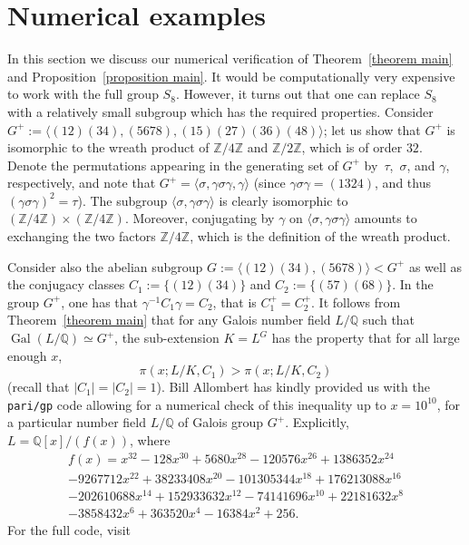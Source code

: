 \documentclass[10pt]{amsart}
\theoremstyle{definition}
\DeclareMathOperator{\Gal}{Gal}
\newcommand{\Q}{\mathbb Q}
\newcommand{\Z}{\mathbb Z}
\begin{document}
\section{Numerical examples}\label{sec:numerics}

In this section we discuss our numerical verification of Theorem~\ref{theorem main} and Proposition~\ref{proposition main}. It would be computationally very expensive to work with the full group $S_8$. However, it turns out that one can replace $S_8$ with a relatively small subgroup which has the required properties.
Consider $G^+:=\langle (12)(34),(5678),(15)(27)(36)(48) \rangle $; let us show that $G^+$ is isomorphic to the wreath product of $\Z/4\Z$ and $\Z/2\Z$, which is of order $32$.
Denote the permutations appearing in the generating set of $G^+$ by~$\tau$,~$\sigma$, and $\gamma$, respectively, and note that
$G^+=\langle \sigma,\gamma\sigma\gamma,\gamma\rangle$
(since $\gamma\sigma\gamma=(1324)$, and thus $(\gamma\sigma\gamma)^2=\tau$).
The subgroup $\langle\sigma,\gamma\sigma\gamma\rangle$ is clearly isomorphic to $(\Z/4\Z)\times (\Z/4\Z)$.
Moreover, conjugating by $\gamma$ on $\langle\sigma,\gamma\sigma\gamma\rangle$ amounts to exchanging the two factors $\Z/4\Z$, which is the definition of the wreath product.

Consider also the abelian subgroup $G:= \langle (12)(34),(5678) \rangle <G^+ $ as well as the conjugacy classes $C_1:=\{(12)(34)\}$ and $C_2:=\{(57)(68)\}$.
In the group $G^+$, one has that $\gamma^{-1} C_1 \gamma =C_2$, that is $C_1^+=C_2^+$. It follows from Theorem~\ref{theorem main} that for any Galois number field $L/\Q$ such that $\Gal(L/\Q) \simeq G^+$, the sub-extension $K=L^{G}$ has the property that for all large enough $x$,
\[ \pi(x;L/K,C_1) >\pi(x;L/K,C_2)\](recall that $|C_1|=|C_2|=1$). Bill Allombert has kindly provided us with the {\tt pari/gp} code allowing for a numerical check of this inequality up to $x=10^{10}$, for a particular number field $L/\Q$ of Galois group $G^+$. Explicitly, $L=\Q[x]/(f(x))$, where
\begin{multline*}
f(x)=x^{32} - 128 x^{30} + 5680 x^{28} - 120576 x^{26} + 1386352 x^{24}\\
 - 9267712 x^{22} + 38233408 x^{20} - 101305344 x^{18} + 176213088 x^{16}\\
- 202610688 x^{14} + 152933632 x^{12}- 74141696 x^{10} + 22181632 x^8\\
- 3858432 x^6 + 363520 x^4 - 16384 x^2 + 256.
\end{multline*}
For the full code, visit
\end{document}
